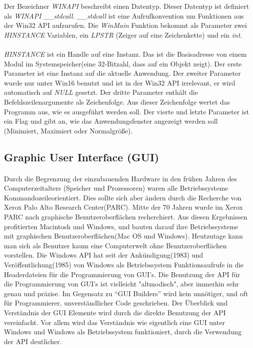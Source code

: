 Der Bezeichner \textit{WINAPI} beschreibt einen Datentyp. Dieser Datentyp ist definiert als \textit{WINAPI \_\_stdcall}. \textit{\_\_stdcall} ist eine Aufrufkonvention um Funktionen aus der Win32 API aufzurufen. Die \textit{WinMain} Funktion bekommt als Parameter zwei \textit{HINSTANCE} Variablen, ein \textit{LPSTR} (Zeiger auf eine Zeichenkette) und ein \textit{int}.\\\\


\textit{HINSTANCE} ist ein Handle auf eine Instanz. Das ist die Basisadresse von einem Modul im Systemspeicher(eine 32-Bitzahl, dass auf ein Objekt zeigt). Der erste Parameter ist eine Instanz auf die aktuelle Anwendung. Der zweiter Parameter wurde nur unter Win16 benutzt und ist in der Win32 API irrelevant, er wird automatisch auf \textit{NULL} gesetzt. Der dritte Parameter enthält die Befehlszeilenargumente als Zeichenfolge. Aus dieser Zeichenfolge wertet das Programm aus, wie es ausgeführt werden soll. Der vierte und letzte Parameter ist ein Flag und gibt an, wie das Anwendungsfenster angezeigt werden soll (Minimiert, Maximiert oder Normalgröße).

\subsection{Graphic User Interface (GUI)}
\paragraph{}
Durch die Begrenzung der einzubauenden Hardware in den frühen Jahren des Computerzeitalters (Speicher und Prozessoren) waren alle Betriebssysteme Kommandozeileorientiert. Dies sollte sich aber ändern durch die Recherche von Xerox Palo Alto Research Center(PARC). Mitte der 70 Jahren wurde im Xerox PARC nach graphische Benutzeroberflächen recherchiert. Aus diesen Ergebnissen profitierten Macintosh und Windows, und bauten darauf ihre Betriebssysteme mit graphischen Benutzeroberflächen(Mac OS und Windows). Heutzutage kann man sich als Benutzer kaum eine Computerwelt ohne Benutzeroberflächen vorstellen. Die Windows API hat seit der Ankündigung(1983) und Veröffentlichung(1985) von Windows als Betriebssystem Funktionsaufrufe in die Headerdateien für die Programmierung von GUI's. Die Benutzung der API für die Programmierung von GUI's ist vielleicht "altmodisch", aber immerhin sehr genau und präzise. Im Gegensatz zu "`GUI Builders"' wird kein unnötiger, und oft für Programmierer, unverständlicher Code geschrieben. Der Überblick und Verständnis der GUI Elemente wird durch die direkte Benutzung der API vereinfacht. Vor allem wird das Verständnis wie eigentlich eine GUI unter Windows und Windows als Betriebssystem funktioniert, durch die Verwendung der API deutlicher.

